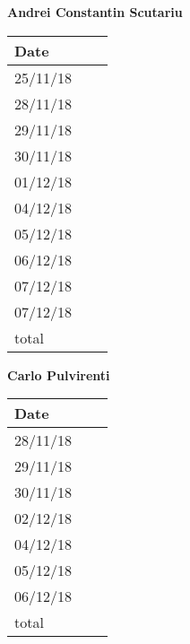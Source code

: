 \documentclass[../main.tex]{subfiles}
\begin{document}
\begin{center}
{\bf Andrei Constantin Scutariu}
	\vspace{2mm}

		\begin{tabular}{p{1.3cm}|p{1.8cm}|p{6.7cm}}
			\hline
			\bf Date & \bf \makebox[1.8cm][c]{Hours} & \bf \makebox[6.7cm][c]{Description} \\
			\hline
			25/11/18 & \makebox[1.8cm][c]{0.5h} & \makebox[6.7cm][c]{Initial Structure}\\
			28/11/18 & \makebox[1.8cm][c]{0.5h} & \makebox[6.7cm][c]{Introduction}\\
			29/11/18 & \makebox[1.8cm][c]{2h} & \makebox[6.7cm][c]{Component view}\\
			30/11/18 & \makebox[1.8cm][c]{1h} & \makebox[6.7cm][c]{Component view}\\
			01/12/18 & \makebox[1.8cm][c]{1h} & \makebox[6.7cm][c]{Requirements traceability}\\
			04/12/18 & \makebox[1.8cm][c]{2h} & \makebox[6.7cm][c]{Reviewing}\\
			05/12/18 & \makebox[1.8cm][c]{2h} & \makebox[6.7cm][c]{Architectural styles and patterns}\\
			06/12/18 & \makebox[1.8cm][c]{4h} & \makebox[6.7cm][c]{Component Interfaces}\\
			07/12/18 & \makebox[1.8cm][c]{1h} & \makebox[6.7cm][c]{Component view}\\
			07/12/18 & \makebox[1.8cm][c]{1h} & \makebox[6.7cm][c]{Reviewing}\\
			total    & \makebox[1.8cm][c]{15h}
		\end{tabular}
\end{center}
\vspace{1cm}

\begin{center}
	{\bf Carlo Pulvirenti}
	\vspace{2mm}

		\begin{tabular}{p{1.3cm}|p{1.8cm}|p{6.7cm}}
			\hline
			\bf Date & \bf \makebox[1.8cm][c]{Hours} & \bf \makebox[6.7cm][c]{Description} \\
			\hline
			28/11/18 & \makebox[1.8cm][c]{1h} & \makebox[6.7cm][c]{Architectural Design}\\
			29/11/18 & \makebox[1.8cm][c]{3h} & \makebox[6.7cm][c]{Runtime View}\\
			30/11/18 & \makebox[1.8cm][c]{2h} & \makebox[6.7cm][c]{Runtime View}\\
			02/12/18 & \makebox[1.8cm][c]{4h} & \makebox[6.7cm][c]{Runtime View}\\
			04/12/18 & \makebox[1.8cm][c]{2h} & \makebox[6.7cm][c]{Reviewing}\\
			05/12/18 & \makebox[1.8cm][c]{3h} & \makebox[6.7cm][c]{Deployment View}\\
			06/12/18 & \makebox[1.8cm][c]{4h} & \makebox[6.7cm][c]{Component Interfaces}\\
			total    & \makebox[1.8cm][c]{19h}
		\end{tabular}
\end{center}
\end{document}
